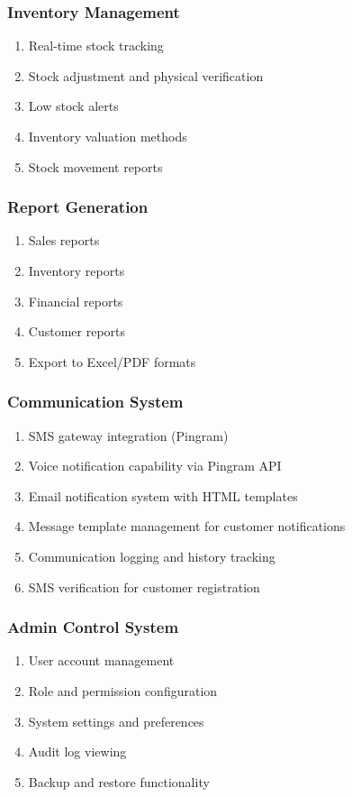 \documentclass[12pt,a4paper]{report}
\begin{document}
\subsubsection{Inventory Management}
\begin{enumerate}[label=\roman*)]
    \item Real-time stock tracking
    \item Stock adjustment and physical verification
    \item Low stock alerts
    \item Inventory valuation methods
    \item Stock movement reports
\end{enumerate}

\subsubsection{Report Generation}
\begin{enumerate}[label=\roman*)]
    \item Sales reports
    \item Inventory reports
    \item Financial reports
    \item Customer reports
    \item Export to Excel/PDF formats
\end{enumerate}

\subsubsection{Communication System}
\begin{enumerate}[label=\roman*)]
    \item SMS gateway integration (Pingram)
    \item Voice notification capability via Pingram API
    \item Email notification system with HTML templates
    \item Message template management for customer notifications
    \item Communication logging and history tracking
    \item SMS verification for customer registration
\end{enumerate}

\subsubsection{Admin Control System}
\begin{enumerate}[label=\roman*)]
    \item User account management
    \item Role and permission configuration
    \item System settings and preferences
    \item Audit log viewing
    \item Backup and restore functionality
\end{enumerate}
\end{document}
